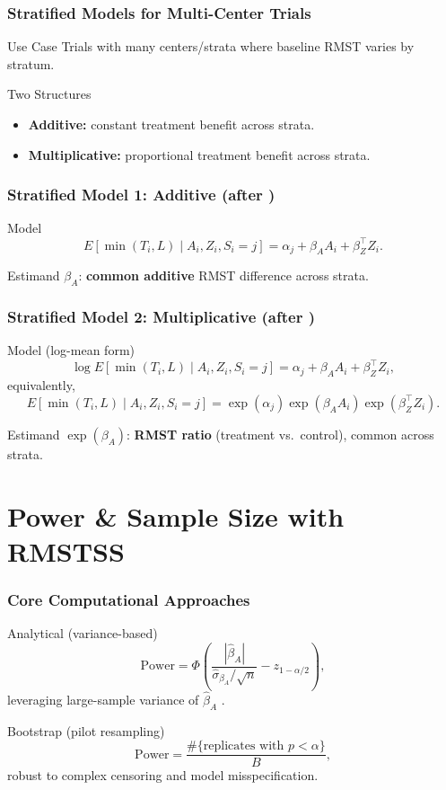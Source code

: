 \documentclass{beamer}
\begin{document}
\begin{frame}
\frametitle{Stratified Models for Multi-Center Trials}
\begin{block}{Use Case}
Trials with many centers/strata where baseline RMST varies by stratum.
\end{block}
\begin{block}{Two Structures}
\begin{itemize}
    \item \textbf{Additive:} constant treatment benefit across strata.
    \item \textbf{Multiplicative:} proportional treatment benefit across strata.
\end{itemize}
\end{block}
\end{frame}

\begin{frame}
\frametitle{Stratified Model 1: Additive (after \cite{zhang2024})}
\begin{block}{Model}
\[
E[\min(T_i,L) \mid A_i, Z_i, S_i=j] = \alpha_j + \beta_A A_i + \beta_Z^\top Z_i.
\]
\end{block}
\begin{block}{Estimand}
$\beta_A$: \textbf{common additive} RMST difference across strata.
\end{block}
\end{frame}

\begin{frame}
\frametitle{Stratified Model 2: Multiplicative (after \cite{wang2019})}
\begin{block}{Model (log-mean form)}
\[
\log E[\min(T_i,L) \mid A_i, Z_i, S_i=j] = \alpha_j + \beta_A A_i + \beta_Z^\top Z_i,
\]
equivalently,
\[
E[\min(T_i,L) \mid A_i, Z_i, S_i=j] = \exp(\alpha_j)\exp(\beta_A A_i)\exp(\beta_Z^\top Z_i).
\]
\end{block}
\begin{block}{Estimand}
$\exp(\beta_A)$: \textbf{RMST ratio} (treatment vs.\ control), common across strata.
\end{block}
\end{frame}

\section{Power \& Sample Size with RMSTSS}
\begin{frame}
\frametitle{Core Computational Approaches}
\begin{block}{Analytical (variance-based)}
\[
\text{Power} = 
\Phi\!\left( \frac{|\widehat{\beta}_A|}{\widehat{\sigma}_{\beta_A}/\sqrt{n}} - z_{1-\alpha/2}\right),
\]
leveraging large-sample variance of $\widehat{\beta}_A$ \cite{royston2013}.
\end{block}

\begin{block}{Bootstrap (pilot resampling)}
\[
\text{Power} = \frac{\#\{\text{replicates with $p<\alpha$}\}}{B},
\]
robust to complex censoring and model misspecification.
\end{block}
\end{frame}
\end{document}
